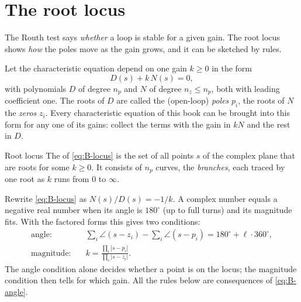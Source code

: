 \section{The root locus}

The Routh test says \emph{whether} a loop is stable for a given gain. The root locus shows \emph{how} the poles move as the gain grows, and it can be sketched by rules.

Let the characteristic equation depend on one gain $k \ge 0$ in the form
\begin{equation}\label{eq:B-locus}
  D(s) + k\,N(s) = 0 ,
\end{equation}
with polynomials $D$ of degree $n_p$ and $N$ of degree $n_z \le n_p$, both with leading coefficient one. The roots of $D$ are called the (open-loop) \emph{poles} $p_i$, the roots of $N$ the \emph{zeros} $z_i$. Every characteristic equation of this book can be brought into this form for any one of its gains: collect the terms with the gain in $kN$ and the rest in $D$.

\begin{definition}{Root locus}
The  of \cref{eq:B-locus} is the set of all points $s$ of the complex plane that are roots for some $k \ge 0$. It consists of $n_p$ curves, the \emph{branches}, each traced by one root as $k$ runs from $0$ to $\infty$.
\end{definition}

Rewrite \cref{eq:B-locus} as $N(s)/D(s) = -1/k$. A complex number equals a negative real number when its angle is $180^\circ$ (up to full turns) and its magnitude fits. With the factored forms this gives two conditions:
\begin{align}
  \text{angle:} \quad & \sum_i \angle(s - z_i) - \sum_i \angle(s - p_i) = 180^\circ + \ell \cdot 360^\circ, \label{eq:B-angle}\\
  \text{magnitude:} \quad & k = \frac{\prod_i |s - p_i|}{\prod_i |s - z_i|} . \label{eq:B-mag}
\end{align}
The angle condition alone decides whether a point is on the locus; the magnitude condition then tells for which gain. All the rules below are consequences of \cref{eq:B-angle}.

